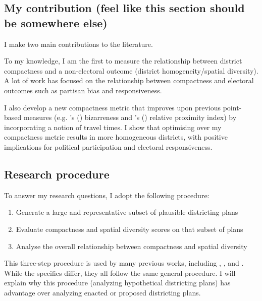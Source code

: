 \documentclass[]{article}
\providecommand{\tightlist}{%
  \setlength{\itemsep}{0pt}\setlength{\parskip}{0pt}}
\begin{document}
\hypertarget{my-contribution-feel-like-this-section-should-be-somewhere-else}{%
\subsection{My contribution (feel like this section should be somewhere
else)}\label{my-contribution-feel-like-this-section-should-be-somewhere-else}}

I make two main contributions to the literature.

To my knowledge, I am the first to measure the relationship between
district compactness and a non-electoral outcome (district
homogeneity/spatial diversity). A lot of work has focused on the
relationship between compactness and electoral outcomes such as partisan
bias and responsiveness.

I also develop a new compactness metric that improves upon previous
point-based measures (e.g. \citeauthor{cm2010}'s (\citeyear{cm2010})
bizarreness and \citeauthor{fh2011}'s (\citeyear{fh2011}) relative
proximity index) by incorporating a notion of travel times. I show that
optimising over my compactness metric results in more homogeneous
districts, with positive implications for political participation and
electoral responsiveness.

\hypertarget{research-procedure}{%
\subsection{Research procedure}\label{research-procedure}}

To answer my research questions, I adopt the following procedure:

\begin{enumerate}
\def\labelenumi{\arabic{enumi}.}
\tightlist
\item
  Generate a large and representative subset of plausible districting
  plans
\item
  Evaluate compactness and spatial diversity scores on that subset of
  plans
\item
  Analyse the overall relationship between compactness and spatial
  diversity
\end{enumerate}

This three-step procedure is used by many previous works, including
\cite{cr2013}, \cite{ddj2019comp}, and \cite{s2020}. While the specifics
differ, they all follow the same general procedure. I will explain why
this procedure (analyzing hypothetical districting plans) has advantage
over analyzing enacted or proposed districting plans.
\end{document}
